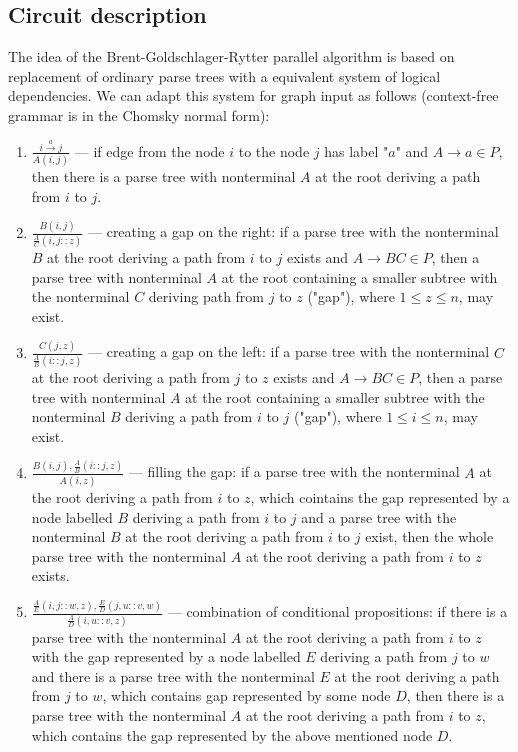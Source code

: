 \subsection{Circuit description}
\label{Bdesc}
The idea of the Brent-Goldschlager-Rytter parallel algorithm is based on replacement of ordinary parse trees with a equivalent system of logical dependencies. We can adapt this system for graph input as follows (context-free grammar is in the Chomsky normal form):
\begin{enumerate}
\item $\frac{i \xrightarrow{a} j}{A(i , j)}$  --- if edge from the node $i$ to the node $j$ has label "$a$" and $A \rightarrow a \in P$, then there is a parse tree with nonterminal $A$ at the root deriving a path from $i$ to $j$.
\\
\item $\frac{B(i , j)}{\frac{A}{C}(i , j :: z)}$ --- creating a gap on the right: if a parse tree with the nonterminal $B$ at the root deriving a path from $i$ to $j$ exists and $A \rightarrow BC \in P$, then a parse tree with nonterminal $A$ at the root containing a smaller subtree with the nonterminal $C$ deriving path from $j$ to $z$ ("gap"), where $1 \le z \le n$, may exist.
\\
\item $\frac{C(j  , z)}{\frac{A}{B}(i :: j  , z)}$ --- creating a gap on the left: if a parse tree with the nonterminal $C$ at the root deriving a path from $j$ to $z$ exists and $A \rightarrow BC \in P$,  then a parse tree with nonterminal $A$ at the root containing a smaller subtree with the nonterminal $B$ deriving a path from $i$ to $j$ ("gap"), where $1 \le i \le n$, may exist.
\\
\item  $\frac{B(i, j), \frac{A}{B}(i :: j  , z)}{A(i, z)}$ --- filling the gap: if a parse tree with the nonterminal $A$ at the root deriving a path from $i$ to $z$, which cointains the gap represented by a node labelled $B$ deriving a path from $i$ to $j$ and a parse tree with the nonterminal $B$ at the root deriving a path from $i$ to $j$ exist, then the whole parse tree with the nonterminal $A$ at the root deriving a path from $i$ to $z$ exists.
\\
\item $\frac{\frac{A}{E}(i , j :: w, z), \frac{E}{D}( j , u :: v , w)}{\frac{A}{D}(i, u :: v , z)}$ --- combination of conditional propositions: if there is a parse tree with the nonterminal $A$ at the root deriving a path from $i$ to $z$ with the gap represented by a node labelled $E$ deriving a path from $j$ to $w$ and there is a parse tree with the nonterminal $E$ at the root deriving a path from $j$ to $w$, which contains gap represented by some node $D$, then there is a parse tree with the nonterminal $A$ at the root deriving a path from $i$ to $z$, which contains the gap represented by the above mentioned node $D$.
\end{enumerate}


